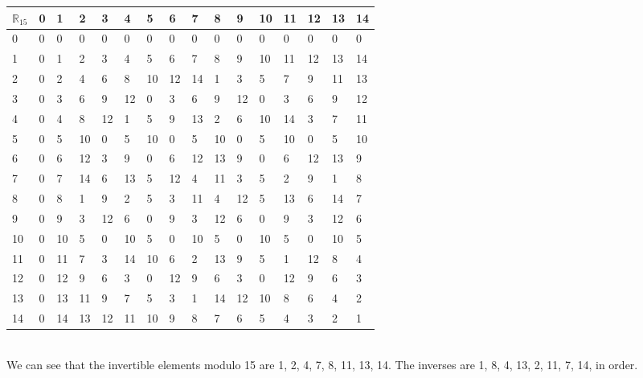 \documentclass[paper=letter, fontsize=11pt]{scrartcl} %
\begin{document}
\begin{tabular}{|l|l|l|l|l|l|l|l|l|l|l|l|l|l|l|l|}
\hline
$\mathbb{R}_{15}$ & 0 & 1  & 2  & 3  & 4  & 5  & 6  & 7  & 8  & 9  & 10 & 11 & 12 & 13 & 14 \\ \hline
0               & 0 & 0  & 0  & 0  & 0  & 0  & 0  & 0  & 0  & 0  & 0  & 0  & 0  & 0  & 0  \\ \hline
1               & 0 & 1  & 2  & 3  & 4  & 5  & 6  & 7  & 8  & 9  & 10 & 11 & 12 & 13 & 14 \\ \hline
2               & 0 & 2  & 4  & 6  & 8  & 10 & 12 & 14 & 1  & 3  & 5  & 7  & 9  & 11 & 13 \\ \hline
3               & 0 & 3  & 6  & 9  & 12 & 0  & 3  & 6  & 9  & 12 & 0  & 3  & 6  & 9  & 12 \\ \hline
4               & 0 & 4  & 8  & 12 & 1  & 5  & 9  & 13 & 2  & 6  & 10 & 14 & 3  & 7  & 11 \\ \hline
5               & 0 & 5  & 10 & 0  & 5  & 10 & 0  & 5  & 10 & 0  & 5  & 10 & 0  & 5  & 10 \\ \hline
6               & 0 & 6  & 12 & 3  & 9  & 0  & 6  & 12 & 13 & 9  & 0  & 6  & 12 & 13 & 9  \\ \hline
7               & 0 & 7  & 14 & 6  & 13 & 5  & 12 & 4  & 11 & 3  & 5  & 2  & 9  & 1  & 8  \\ \hline
8               & 0 & 8  & 1  & 9  & 2  & 5  & 3  & 11 & 4  & 12 & 5  & 13 & 6  & 14 & 7  \\ \hline
9               & 0 & 9  & 3  & 12 & 6  & 0  & 9  & 3  & 12 & 6  & 0  & 9  & 3  & 12 & 6  \\ \hline
10              & 0 & 10 & 5  & 0  & 10 & 5  & 0  & 10 & 5  & 0  & 10 & 5  & 0  & 10 & 5  \\ \hline
11              & 0 & 11 & 7  & 3  & 14 & 10 & 6  & 2  & 13 & 9  & 5  & 1  & 12 & 8  & 4  \\ \hline
12              & 0 & 12 & 9  & 6  & 3  & 0  & 12 & 9  & 6  & 3  & 0  & 12 & 9  & 6  & 3  \\ \hline
13              & 0 & 13 & 11 & 9  & 7  & 5  & 3  & 1  & 14 & 12 & 10 & 8  & 6  & 4  & 2  \\ \hline
14              & 0 & 14 & 13 & 12 & 11 & 10 & 9  & 8  & 7  & 6  & 5  & 4  & 3  & 2  & 1  \\ \hline
\end{tabular}
\\

We can see that the invertible elements modulo 15 are 1, 2, 4, 7, 8, 11, 13, 14.
The inverses are 1, 8, 4, 13, 2, 11, 7, 14, in order.\\
\end{document}

